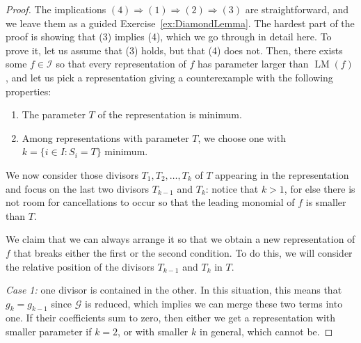 \documentclass[fleqn, a4paper, twoside]{article}
\newcommand{\leadm}[1]{\operatorname{LM}(#1)}
\newcommand{\0}{\langle 0\rangle}
\newcommand{\II}{\mathcal{I}}
\newcommand{\GG}{\mathcal G}
\newenvironment{tenumerate}{
 \begin{enumerate}
  \setlength{\itemsep}{0pt}
  \setlength{\parskip}{0pt}
}{\end{enumerate}}
\DeclareRobustCommand{\[}{\begin{equation}}%
\DeclareRobustCommand{\]}{\end{equation}}%
\theoremstyle{mytheorem}
\theoremstyle{introthm}
\theoremstyle{mydefinition}
\theoremstyle{mydefinition2}
\theoremstyle{plain} %
\newcommand{\?}{\,?\,}
\theoremstyle{mytheorem}
\theoremstyle{plain} %
\begin{document}
\begin{proof}
The implications $(4)\Longrightarrow (1)\Longrightarrow (2)
\Longrightarrow (3)$ are straightforward, and we leave them
as a guided Exercise~\ref{ex:DiamondLemma}.
The hardest part of the proof is
showing that (3) implies (4), which we go through in
detail here. To prove it, let us assume that (3) holds, but
that (4) does not. Then, there exists some $f\in\II$
so that every representation of $f$ has parameter 
larger than $\leadm{f}$, and let us pick a representation
giving a counterexample with the following properties:
\begin{tenumerate}
\item The parameter $T$ of the representation is minimum.
\item Among representations with parameter $T$, we choose one
with $k=\{ i\in I : S_i=T\}$ minimum.
\end{tenumerate}
We now consider those divisors $T_1,T_2,\ldots,T_k$
of $T$ appearing in the representation and focus on the last two
divisors $T_{k-1}$
and $T_k$: notice that $k>1$, for else there is not room for
cancellations to occur so that the leading monomial of $f$ is smaller than $T$. 

We claim that we can always arrange it so that
we obtain a new representation of $f$ that breaks either
the first or the second condition. To do this, we will consider
the relative position of the divisors $T_{k-1}$ and $T_k$
in $T$.

\emph{Case 1:} one divisor is contained in the other. In this
situation, this means that $g_k = g_{k-1}$ since $\GG$ is
reduced, which implies we can merge these two terms into one.
If their coefficients sum to zero, then either we get a 
representation with smaller parameter if $k=2$, or with
smaller $k$ in general, which cannot be.


\end{proof}
\end{document}
